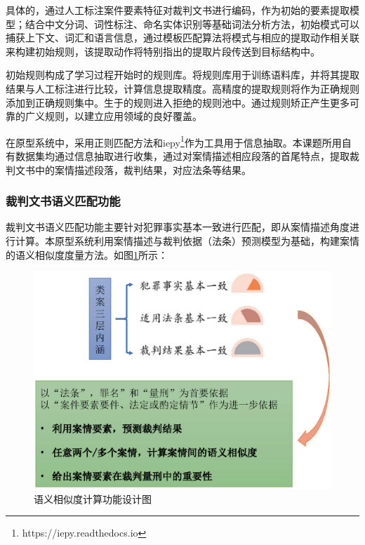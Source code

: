 具体的，通过人工标注案件要素特征对裁判文书进行编码，作为初始的要素提取模型；结合中文分词、词性标注、命名实体识别等基础词法分析方法，初始模式可以捕获上下文、词汇和语言信息，通过模板匹配算法将模式与相应的提取动作相关联来构建初始规则，该提取动作将特别指出的提取片段传送到目标结构中。

初始规则构成了学习过程开始时的规则库。将规则库用于训练语料库，并将其提取结果与人工标注进行比较，计算信息提取精度。高精度的提取规则将作为正确规则添加到正确规则集中。生于的规则进入拒绝的规则池中。通过规则矫正产生更多可靠的广义规则，以建立应用领域的良好覆盖。

在原型系统中，采用正则匹配方法和iepy\footnote{https://iepy.readthedocs.io}作为工具用于信息抽取。本课题所用自有数据集均通过信息抽取进行收集，通过对案情描述相应段落的首尾特点，提取裁判文书中的案情描述段落，裁判结果，对应法条等结果。






\subsubsection{裁判文书语义匹配功能}
\label{sec:sys_content}
裁判文书语义匹配功能主要针对犯罪事实基本一致进行匹配，即从案情描述角度进行计算。本原型系统利用案情描述与裁判依据（法条）预测模型为基础，构建案情的语义相似度度量方法。如图\ref{fig:sys_similarity}所示：
\begin{figure}[htbp]%
    \centering
    \includegraphics[scale=0.5, clip=true]{./sources/sys_similarity.eps}
    \caption{\label{fig:sys_similarity}语义相似度计算功能设计图}
\end{figure}

